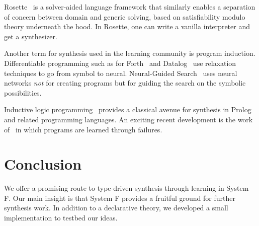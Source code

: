 \documentclass[acmsmall]{acmart}
\theoremstyle{mytheoremstyle}
\begin{document}
Rosette~\cite{rosette} is a solver-aided language framework that similarly enables a separation of concern between domain and generic solving, based on satisfiability modulo theory underneath the hood. In Rosette, one can write a vanilla interpreter and get a synthesizer.

Another term for synthesis used in the learning community is program induction.
Differentiable programming such as for Forth~\cite{dforth} and Datalog~\cite{ddatalog} use relaxation techniques to go from symbol to neural.
Neural-Guided Search~\cite{webyrd-nips,dreamcoder} uses neural networks \emph{not} for creating programs but for guiding the search on the symbolic possibilities.

Inductive logic programming~\cite{ilp} provides a classical avenue for synthesis in Prolog and related programming languages. An exciting recent development is the work of~\citet{cropper} in which programs are learned through failures.


\section{Conclusion}

We offer a promising route to type-driven synthesis through learning in System F. Our main insight is that System F provides a fruitful ground for further synthesis work. In addition to a declarative theory, we developed a small implementation to testbed our ideas.




\end{document}
